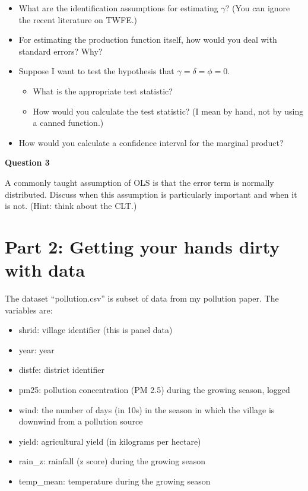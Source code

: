\documentclass[
]{article}
\providecommand{\tightlist}{%
  \setlength{\itemsep}{0pt}\setlength{\parskip}{0pt}}
\begin{document}
\begin{itemize}
\tightlist
\item
  What are the identification assumptions for estimating \(\gamma\)? (You can ignore the recent literature on TWFE.)
\item
  For estimating the production function itself, how would you deal with standard errors? Why?
\item
  Suppose I want to test the hypothesis that \(\gamma=\delta=\phi=0\).

  \begin{itemize}
  \tightlist
  \item
    What is the appropriate test statistic?
  \item
    How would you calculate the test statistic? (I mean by hand, not by using a canned function.)
  \end{itemize}
\item
  How would you calculate a confidence interval for the marginal product?
\end{itemize}

\textbf{Question 3}

A commonly taught assumption of OLS is that the error term is normally distributed. Discuss when this assumption is particularly important and when it is not. (Hint: think about the CLT.)

\section{Part 2: Getting your hands dirty with data}\label{part-2-getting-your-hands-dirty-with-data}

The dataset ``pollution.csv'' is subset of data from my pollution paper. The variables are:

\begin{itemize}
\tightlist
\item
  shrid: village identifier (this is panel data)
\item
  year: year
\item
  distfe: district identifier
\item
  pm25: pollution concentration (PM 2.5) during the growing season, logged
\item
  wind: the number of days (in 10s) in the season in which the village is downwind from a pollution source
\item
  yield: agricultural yield (in kilograms per hectare)
\item
  rain\_z: rainfall (z score) during the growing season
\item
  temp\_mean: temperature during the growing season
\end{itemize}
\end{document}
